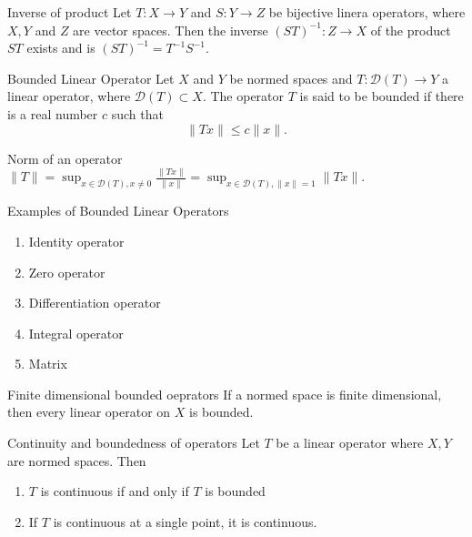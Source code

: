 \documentclass[avery5388,grid,frame]{flashcards}
\begin{document}
\begin{flashcard}[Theorem]{Inverse of product}
Let $T\colon X\rightarrow Y$ and $S\colon Y\rightarrow Z$ be bijective linera operators, where $X,Y$ and $Z$ are vector spaces. Then the inverse $(ST)^{-1}\colon Z\rightarrow X$ of the product $ST$ exists and is $(ST)^{-1}=T^{-1}S^{-1}$.
\end{flashcard}

\begin{flashcard}[Definition]{Bounded Linear Operator}
Let $X$ and $Y$ be normed spaces and $T\colon\mathscr{D}(T)\rightarrow Y$ a linear operator, where $\mathscr{D}(T)\subset X$. The operator $T$ is said to be bounded if there is a real number $c$ such that
\[\|Tx\|\leq c\|x\|.\]
\end{flashcard}

\begin{flashcard}[Definition]{Norm of an operator}
$\|T\|=\sup_{x\in\mathscr{D}(T),x\neq 0}\frac{\|Tx\|}{\|x\|}=\sup_{x\in\mathscr{D}(T),\|x\|=1}\|Tx\|$.
\end{flashcard}

\begin{flashcard}[Example]{Examples of Bounded Linear Operators}
\begin{enumerate}
\item Identity operator
\item Zero operator
\item Differentiation operator
\item Integral operator
\item Matrix
\end{enumerate}
\end{flashcard}

\begin{flashcard}[Theorem]{Finite dimensional bounded oeprators}
If a normed space is finite dimensional, then every linear operator on $X$ is bounded.
\end{flashcard}

\begin{flashcard}[Theorem]{Continuity and boundedness of operators}
Let $T$ be a linear operator where $X,Y$ are normed spaces. Then
\begin{enumerate}
\item $T$ is continuous if and only if $T$ is bounded
\item If $T$ is continuous at a single point, it is continuous.
\end{enumerate}
\end{flashcard}
\end{document}
